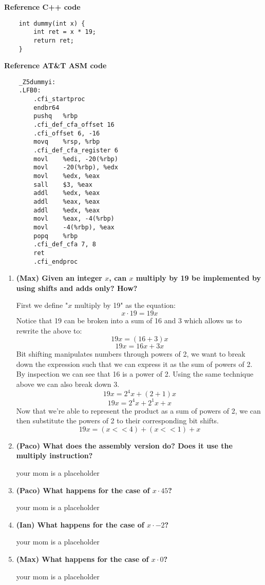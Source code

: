 \documentclass{article}
\begin{document}


{\huge \textbf{Reference C++ code\:}}

\begin{verbatim}
    int dummy(int x) {
        int ret = x * 19;
        return ret;
    }
\end{verbatim}

\vfill
\newpage

{\huge \textbf{Reference AT\&T ASM code\:}}
\begin{verbatim}
    _Z5dummyi:
    .LFB0:
	    .cfi_startproc
	    endbr64
	    pushq	%rbp
	    .cfi_def_cfa_offset 16
	    .cfi_offset 6, -16
	    movq	%rsp, %rbp
	    .cfi_def_cfa_register 6
	    movl	%edi, -20(%rbp)
	    movl	-20(%rbp), %edx
	    movl	%edx, %eax
	    sall	$3, %eax
	    addl	%edx, %eax
	    addl	%eax, %eax
	    addl	%edx, %eax
	    movl	%eax, -4(%rbp)
	    movl	-4(%rbp), %eax
	    popq	%rbp
	    .cfi_def_cfa 7, 8
	    ret
	    .cfi_endproc
\end{verbatim}

\vfill
\newpage

\begin{enumerate}
    \item \textbf{(Max) Given an integer \( x \), can \( x \) multiply by 19 be implemented by using shifts and adds only? How?}
    
    First we define "\( x \) multiply by 19" as the equation:
    \[
    x \cdot 19 = 19x
    \]
    Notice that 19 can be broken into a sum of 16 and 3 which allows us to rewrite the above to:
    \[
    19x = (16+3)x 
    \]
    \[
    19x = 16x + 3x
    \]
    Bit shifting manipulates numbers through powers of 2, we want to break down the expression such that we
    can express it as the sum of powers of 2. By inspection we can see that 16 is a power of 2. Using the same
    technique above we can also break down 3.
    \[
    19x = 2^4x + (2+1)x
    \]
    \[
    19x = 2^4x + 2^1x + x
    \]
    Now that we're able to represent the product as a sum of powers of 2, we can then substitute the powers of 2 to
    their corresponding bit shifts.
    \[
    19x = (x << 4) + (x << 1) + x
    \]

    \item \textbf{(Paco) What does the assembly version do? Does it use the multiply instruction?}
    
    your mom is a placeholder

    \item \textbf{(Paco) What happens for the case of \( x \cdot 45 \)?}
    
    your mom is a placeholder

    \item \textbf{(Ian) What happens for the case of \( x \cdot -2 \)?}
    
    your mom is a placeholder

    \item \textbf{(Max) What happens for the case of \( x \cdot  0 \)?}
    
    your mom is a placeholder
\end{enumerate}
\end{document}
